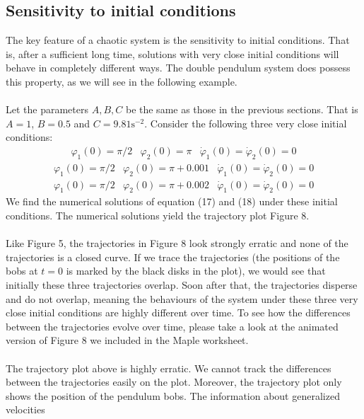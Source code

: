 \documentclass[11pt]{article}
\begin{document}
\subsection{Sensitivity to initial conditions}
The key feature of a chaotic system is the sensitivity to initial conditions. That is, after a sufficient long time,
solutions with very close initial conditions will behave in completely different ways. The double pendulum
system does possess this property, as we will see in the following example. \\
\\
Let the parameters \(A, B,C\) be the same as those in the previous sections.
That is \(A = 1\), \(B= 0.5\) and \(C = 9.81 \mathrm{s}^{-2}\).
Consider the following three very close initial conditions:
\begin{eqnarray}
  \varphi_1(0)=\pi/2  &\varphi_2(0) = \pi & \dot{\varphi}_1(0) = \dot{\varphi}_2(0) = 0
\end{eqnarray}
\begin{eqnarray}
  \varphi_1(0)=\pi/2  &\varphi_2(0) = \pi + 0.001 & \dot{\varphi}_1(0) = \dot{\varphi}_2(0) = 0
\end{eqnarray}
\begin{eqnarray}
  \varphi_1(0)=\pi/2  &\varphi_2(0) = \pi + 0.002 & \dot{\varphi}_1(0) = \dot{\varphi}_2(0) = 0
\end{eqnarray}
We find the numerical solutions of equation (17) and (18) under these initial conditions. The numerical solutions
yield the trajectory plot Figure 8. \\
\\
Like Figure 5, the trajectories in Figure 8 look strongly erratic and none of the trajectories is a closed curve.
If we trace the trajectories (the positions of the bobs at \(t=0\) is marked by the black disks in the plot),
we would see that initially these three trajectories overlap.
Soon after that, the trajectories disperse and do not overlap, meaning the behaviours
of the system under these three very close initial conditions are highly different over time.
To see how the differences between the trajectories evolve over time, please take a look at the animated version
of Figure 8 we included in the Maple worksheet.\\
\\
The trajectory plot above is highly erratic. We cannot track the differences between the trajectories easily on the plot.
Moreover, the trajectory plot only shows the position of the pendulum bobs. The information about generalized velocities
\end{document}
